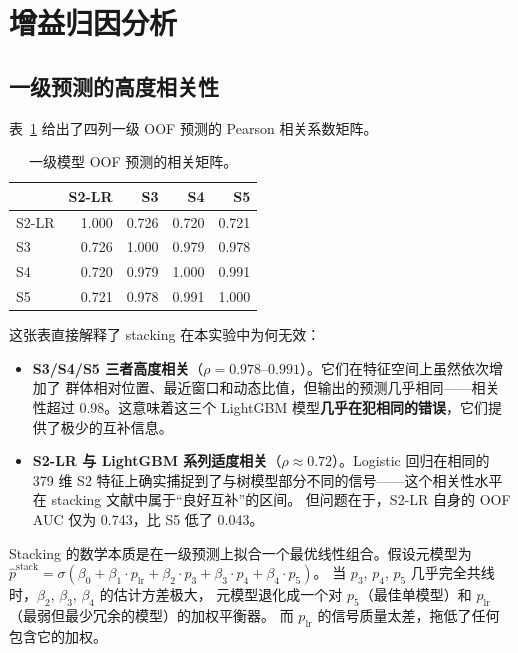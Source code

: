 \documentclass[11pt,UTF8,fontset=windows]{ctexrep}
\begin{document}
\section{增益归因分析}

\subsection{一级预测的高度相关性}

表~\ref{tab:rq3-correlation} 给出了四列一级 OOF 预测的 Pearson 相关系数矩阵。

\begin{table}[h]
\centering
\caption{一级模型 OOF 预测的相关矩阵。}
\label{tab:rq3-correlation}
\begin{tabular}{lrrrr}
\toprule
& S2-LR & S3 & S4 & S5 \\
\midrule
S2-LR & 1.000 & 0.726 & 0.720 & 0.721 \\
S3    & 0.726 & 1.000 & 0.979 & 0.978 \\
S4    & 0.720 & 0.979 & 1.000 & 0.991 \\
S5    & 0.721 & 0.978 & 0.991 & 1.000 \\
\bottomrule
\end{tabular}
\end{table}

这张表直接解释了 stacking 在本实验中为何无效：

\begin{itemize}
\item \textbf{S3/S4/S5 三者高度相关}（$\rho = 0.978\text{--}0.991$）。它们在特征空间上虽然依次增加了
群体相对位置、最近窗口和动态比值，但输出的预测几乎相同——相关性超过 0.98。这意味着这三个 LightGBM
模型\textbf{几乎在犯相同的错误}，它们提供了极少的互补信息。
\item \textbf{S2-LR 与 LightGBM 系列适度相关}（$\rho \approx 0.72$）。Logistic 回归在相同的 379 维
S2 特征上确实捕捉到了与树模型部分不同的信号——这个相关性水平在 stacking 文献中属于“良好互补”的区间。
但问题在于，S2-LR 自身的 OOF AUC 仅为 0.743，比 S5 低了 0.043。
\end{itemize}

Stacking 的数学本质是在一级预测上拟合一个最优线性组合。假设元模型为
$\hat p^{\text{stack}} = \sigma(\beta_0 + \beta_1\cdot p_{\text{lr}} + \beta_2\cdot p_3
+ \beta_3\cdot p_4 + \beta_4\cdot p_5)$。
当 $p_3$, $p_4$, $p_5$ 几乎完全共线时，$\beta_2$, $\beta_3$, $\beta_4$ 的估计方差极大，
元模型退化成一个对 $p_5$（最佳单模型）和 $p_{\mathrm{lr}}$（最弱但最少冗余的模型）的加权平衡器。
而 $p_{\mathrm{lr}}$ 的信号质量太差，拖低了任何包含它的加权。
\end{document}
